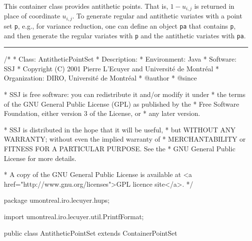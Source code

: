 
This container class provides antithetic points.
That is, $1 - u_{i,j}$ is returned in place of coordinate $u_{i,j}$.
To generate regular and antithetic variates with a point
set \texttt{p}, e.g., for variance reduction, one can define an
 object \texttt{pa} that contains \texttt{p},
and then generate the regular variates with \texttt{p} and the
antithetic variates with \texttt{pa}.



\bigskip\hrule\bigskip

\begin{code}
\begin{hide}
/*
 * Class:        AntitheticPointSet
 * Description:  
 * Environment:  Java
 * Software:     SSJ 
 * Copyright (C) 2001  Pierre L'Ecuyer and Université de Montréal
 * Organization: DIRO, Université de Montréal
 * @author       
 * @since

 * SSJ is free software: you can redistribute it and/or modify it under
 * the terms of the GNU General Public License (GPL) as published by the
 * Free Software Foundation, either version 3 of the License, or
 * any later version.

 * SSJ is distributed in the hope that it will be useful,
 * but WITHOUT ANY WARRANTY; without even the implied warranty of
 * MERCHANTABILITY or FITNESS FOR A PARTICULAR PURPOSE.  See the
 * GNU General Public License for more details.

 * A copy of the GNU General Public License is available at
   <a href="http://www.gnu.org/licenses">GPL licence site</a>.
 */
\end{hide}
package umontreal.iro.lecuyer.hups;\begin{hide}

import umontreal.iro.lecuyer.util.PrintfFormat;
\end{hide}

public class AntitheticPointSet extends ContainerPointSet \begin{hide} {
\end{hide}
\end{code}

